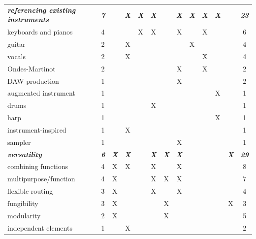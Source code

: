 \documentclass[letterpaper, 12pt]{article}
\begin{document}
\begin{spacing}{1.1}
\begin{supertabular}{L{5.5cm}cccccccccccc}
        \emph{\textbf{referencing existing instruments}} & \emph{\textbf{7}} & & \emph{\textbf{X}} & \emph{\textbf{X}  } & \emph{\textbf{X}} & & \emph{\textbf{X}} & \emph{\textbf{X}} & \emph   {\textbf{X}} & \emph{\textbf{X}} & & \emph{\textbf{23}} \\
        keyboards and pianos             & 4  &   &   & X & X &   & X &   & X &   &   & 6  \\
        guitar                           & 2  &   & X &   &   &   &   & X &   &   &   & 4  \\
        vocals                           & 2  &   & X &   &   &   &   &   & X &   &   & 4  \\
        Ondes-Martinot                   & 2  &   &   &   &   &   & X &   & X &   &   & 2  \\
        DAW production                   & 1  &   &   &   &   &   & X &   &   &   &   & 2  \\
        augmented instrument             & 1  &   &   &   &   &   &   &   &   & X &   & 1  \\
        drums                            & 1  &   &   &   & X &   &   &   &   &   &   & 1  \\
        harp                             & 1  &   &   &   &   &   &   &   &   & X &   & 1  \\
        instrument-inspired              & 1  &   & X &   &   &   &   &   &   &   &   & 1  \\
        sampler                          & 1  &   &   &   &   &   & X &   &   &   &   & 1  \\
        \hline
    
        \emph{\textbf{versatility}} & \emph{\textbf{6}} & \emph{\textbf{X}} & \emph{\textbf{X}} & & \emph{\textbf{X}} & \emph{\textbf{X}} & \emph{\textbf{X}} & & & & \emph{\textbf{X}} & \emph{\textbf{29}} \\
        combining functions              & 4  & X & X &   & X &   & X &   &   &   &   & 8  \\
        multipurpose/function            & 4  & X &   &   & X & X & X &   &   &   &   & 7  \\
        flexible routing                 & 3  & X &   &   & X &   & X &   &   &   &   & 4  \\
        fungibility                      & 3  & X &   &   &   & X &   &   &   &   & X & 3  \\
        modularity                       & 2  & X &   &   &   & X &   &   &   &   &   & 5  \\
        independent elements             & 1  &   & X &   &   &   &   &   &   &   &   & 2  \\
        \hline
        

\end{supertabular}
\end{spacing}
\end{document}
